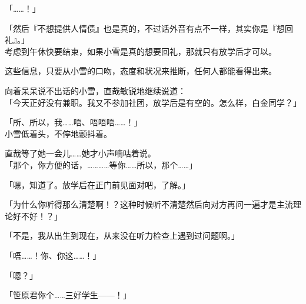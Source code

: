 「……！」

「然后『不想提供人情债』也是真的，不过话外音有点不一样，其实你是『想回礼』。」\\

考虑到午休快要结束，如果小雪是真的想要回礼，那就只有放学后才可以。

这些信息，只要从小雪的口吻，态度和状况来推断，任何人都能看得出来。

向着呆呆说不出话的小雪，直哉敏锐地继续说道：\\

「今天正好没有兼职。我又不参加社团，放学后是有空的。怎么样，白金同学？」

「所、所以，我……唔、唔唔唔……！」\\

小雪低着头，不停地颤抖着。

直哉等了她一会儿……她才小声嘀咕着说。\\

「那个，你方便的话，…………等你……所以，那个……」

「嗯，知道了。放学后在正门前见面对吧，了解。」

「为什么你听得那么清楚啊！？这种时候听不清楚然后向对方再问一遍才是主流理论好不好！？」

「不是，我从出生到现在，从来没在听力检查上遇到过问题啊。」

「唔……！你、你这……！」

「嗯？」

「笹原君你个……三好学生——！」\\

